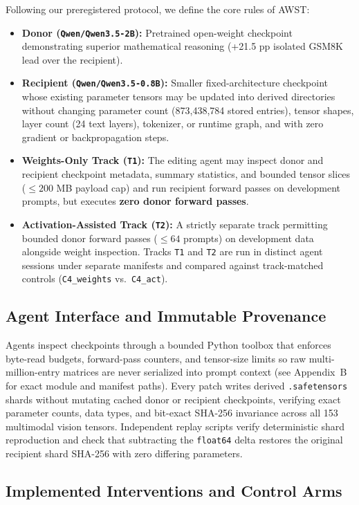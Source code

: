 \documentclass[11pt]{article}
\newcommand{\codepath}[1]{\texttt{\nolinkurl{#1}}}
\begin{document}
Following our preregistered protocol, we define the core rules of AWST:
\begin{itemize}
\item \textbf{Donor (\codepath{Qwen/Qwen3.5-2B}):} Pretrained open-weight checkpoint demonstrating superior mathematical reasoning (+21.5 pp isolated GSM8K lead over the recipient).
\item \textbf{Recipient (\codepath{Qwen/Qwen3.5-0.8B}):} Smaller fixed-architecture checkpoint whose existing parameter tensors may be updated into derived directories without changing parameter count (873,438,784 stored entries), tensor shapes, layer count (24 text layers), tokenizer, or runtime graph, and with zero gradient or backpropagation steps.
\item \textbf{Weights-Only Track (\texttt{T1}):} The editing agent may inspect donor and recipient checkpoint metadata, summary statistics, and bounded tensor slices ($\le 200$ MB payload cap) and run recipient forward passes on development prompts, but executes \textbf{zero donor forward passes}.
\item \textbf{Activation-Assisted Track (\texttt{T2}):} A strictly separate track permitting bounded donor forward passes ($\le 64$ prompts) on development data alongside weight inspection. Tracks \texttt{T1} and \texttt{T2} are run in distinct agent sessions under separate manifests and compared against track-matched controls (\texttt{C4\_weights} vs.\ \texttt{C4\_act}).
\end{itemize}

\subsection{Agent Interface and Immutable Provenance}

Agents inspect checkpoints through a bounded Python toolbox that enforces byte-read budgets, forward-pass counters, and tensor-size limits so raw multi-million-entry matrices are never serialized into prompt context (see Appendix~B for exact module and manifest paths). Every patch writes derived \texttt{.safetensors} shards without mutating cached donor or recipient checkpoints, verifying exact parameter counts, data types, and bit-exact SHA-256 invariance across all 153 multimodal vision tensors. Independent replay scripts verify deterministic shard reproduction and check that subtracting the \texttt{float64} delta restores the original recipient shard SHA-256 with zero differing parameters.

\subsection{Implemented Interventions and Control Arms}
\end{document}
